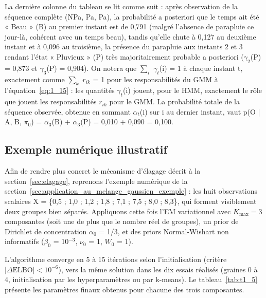 La dernière colonne du tableau se lit comme suit : après observation de la séquence complète (NPa, Pa, Pa), la probabilité a posteriori que le temps ait été « Beau » (B) au premier instant est de 0,791 (malgré l'absence de parapluie ce jour-là, cohérent avec un temps beau), tandis qu'elle chute à 0,127 au deuxième instant et à 0,096 au troisième, la présence du parapluie aux instants 2 et 3 rendant l'état « Pluvieux » (P) très majoritairement probable a posteriori ($\gamma _{2}$(P) = 0,873 et $\gamma _{3}$(P) = 0,904). On notera que $\sum_{i}$ $\gamma _{t}$(i) = 1 à chaque instant t, exactement comme $\sum_{k}$ $r_{ik}$ = 1 pour les responsabilités du GMM à l'équation~\eqref{eq:1_15} : les quantités $\gamma _{t}$(i) jouent, pour le HMM, exactement le rôle que jouent les responsabilités $r_{ik}$ pour le GMM. La probabilité totale de la séquence observée, obtenue en sommant $\alpha _{t}$(i) sur i au dernier instant, vaut p(O | A, B, $\pi _{0}$) = $\alpha _{3}$(B) + $\alpha _{3}$(P) = 0,010 + 0,090 = 0,100.

\subsection{Exemple numérique illustratif}\label{sec:exemple_numerique_illustratif}
Afin de rendre plus concret le mécanisme d'élagage décrit à la section~\ref{sec:elagage}, reprenons l'exemple numérique de la section~\ref{sec:application_au_melange_gaussien_exemple} : les huit observations scalaires X = \{0,5 ; 1,0 ; 1,2 ; 1,8 ; 7,1 ; 7,5 ; 8,0 ; 8,3\}, qui forment visiblement deux groupes bien séparés. Appliquons cette fois l'EM variationnel avec $K_{\max} = 3$ composantes (soit une de plus que le nombre réel de groupes), un prior de Dirichlet de concentration $\alpha _{0}$ = 1/3, et des priors Normal-Wishart non informatifs ($\beta _{0}$ = 10$^{-3}$, $\nu _{0}$ = 1, $W_{0}$ = 1).

L'algorithme converge en 5 à 15 itérations selon l'initialisation (critère $|\Delta \mathrm{ELBO}| < 10^{-6}$), vers la même solution dans les dix essais réalisés (graines 0 à 4, initialisation par les hyperparamètres ou par k-means). Le tableau~\ref{tab:t1_5} présente les paramètres finaux obtenus pour chacune des trois composantes.


